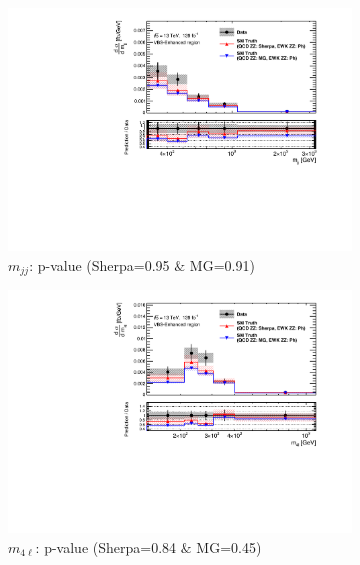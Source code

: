 \begin{figure}[!htb]
    \centering
    \begin{subfigure}{.48\textwidth}
        \centering
        \includegraphics[width=.98\linewidth]{figures/Results/CrossSection_VBSEnhanced/xs_mjj_SR.pdf}
        \caption{ \footnotesize{$m_{jj}$: p-value (Sherpa=0.95 $\&$ MG=0.91)}}
    \end{subfigure}
    \begin{subfigure}{.48\textwidth}
        \centering
        \includegraphics[width=.98\linewidth]{figures/Results/CrossSection_VBSEnhanced/xs_m4l_SR.pdf}
        \caption{ \footnotesize{$m_{4\ell}$: p-value (Sherpa=0.84 $\&$ MG=0.45)} }
    \end{subfigure}\\
    \begin{subfigure}{.48\textwidth}

\end{subfigure}
\end{figure}
